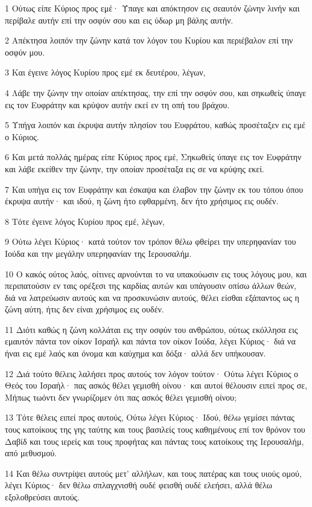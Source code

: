 \par 1 Ούτως είπε Κύριος προς εμέ· Ύπαγε και απόκτησον εις σεαυτόν ζώνην λινήν και περίβαλε αυτήν επί την οσφύν σου και εις ύδωρ μη βάλης αυτήν.
\par 2 Απέκτησα λοιπόν την ζώνην κατά τον λόγον του Κυρίου και περιέβαλον επί την οσφύν μου.
\par 3 Και έγεινε λόγος Κυρίου προς εμέ εκ δευτέρου, λέγων,
\par 4 Λάβε την ζώνην την οποίαν απέκτησας, την επί την οσφύν σου, και σηκωθείς ύπαγε εις τον Ευφράτην και κρύψον αυτήν εκεί εν τη οπή του βράχου.
\par 5 Υπήγα λοιπόν και έκρυψα αυτήν πλησίον του Ευφράτου, καθώς προσέταξεν εις εμέ ο Κύριος.
\par 6 Και μετά πολλάς ημέρας είπε Κύριος προς εμέ, Σηκωθείς ύπαγε εις τον Ευφράτην και λάβε εκείθεν την ζώνην, την οποίαν προσέταξα εις σε να κρύψης εκεί.
\par 7 Και υπήγα εις τον Ευφράτην και έσκαψα και έλαβον την ζώνην εκ του τόπου όπου έκρυψα αυτήν· και ιδού, η ζώνη ήτο εφθαρμένη, δεν ήτο χρήσιμος εις ουδέν.
\par 8 Τότε έγεινε λόγος Κυρίου προς εμέ, λέγων,
\par 9 Ούτω λέγει Κύριος· κατά τούτον τον τρόπον θέλω φθείρει την υπερηφανίαν του Ιούδα και την μεγάλην υπερηφανίαν της Ιερουσαλήμ.
\par 10 Ο κακός ούτος λαός, οίτινες αρνούνται το να υπακούωσιν εις τους λόγους μου, και περιπατούσιν εν ταις ορέξεσι της καρδίας αυτών και υπάγουσιν οπίσω άλλων θεών, διά να λατρεύωσιν αυτούς και να προσκυνώσιν αυτούς, θέλει είσθαι εξάπαντος ως η ζώνη αύτη, ήτις δεν είναι χρήσιμος εις ουδέν.
\par 11 Διότι καθώς η ζώνη κολλάται εις την οσφύν του ανθρώπου, ούτως εκόλλησα εις εμαυτόν πάντα τον οίκον Ισραήλ και πάντα τον οίκον Ιούδα, λέγει Κύριος· διά να ήναι εις εμέ λαός και όνομα και καύχημα και δόξα· αλλά δεν υπήκουσαν.
\par 12 Διά τούτο θέλεις λαλήσει προς αυτούς τον λόγον τούτον· Ούτω λέγει Κύριος ο Θεός του Ισραήλ· πας ασκός θέλει γεμισθή οίνου· και αυτοί θέλουσιν ειπεί προς σε, Μήπως τωόντι δεν γνωρίζομεν ότι πας ασκός θέλει γεμισθή οίνου;
\par 13 Τότε θέλεις ειπεί προς αυτούς, Ούτω λέγει Κύριος· Ιδού, θέλω γεμίσει πάντας τους κατοίκους της γης ταύτης και τους βασιλείς τους καθημένους επί τον θρόνον του Δαβίδ και τους ιερείς και τους προφήτας και πάντας τους κατοίκους της Ιερουσαλήμ, από μεθυσμού.
\par 14 Και θέλω συντρίψει αυτούς μετ' αλλήλων, και τους πατέρας και τους υιούς ομού, λέγει Κύριος· δεν θέλω σπλαγχνισθή ουδέ φεισθή ουδέ ελεήσει, αλλά θέλω εξολοθρεύσει αυτούς.
